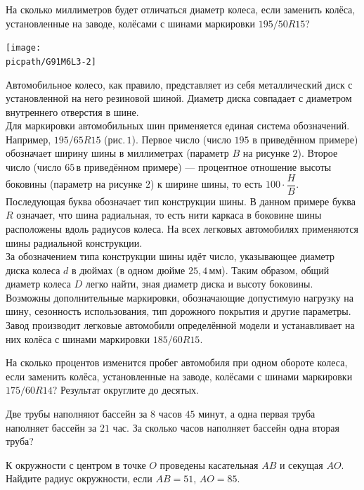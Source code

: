 \begin{homework}[number=3]
	\begin{listofex}
		\item На сколько миллиметров будет отличаться диаметр колеса, если заменить колёса, установленные на заводе, колёсами с шинами маркировки \( 195/50 R15 \)?
		\begin{center}
			\texttt{[image: \\picpath/G91M6L3-2]}
		\end{center}
		Автомобильное колесо, как правило, представляет из себя металлический диск с установленной на него резиновой шиной. Диаметр диска совпадает с диаметром внутреннего отверстия в шине.\\
		Для маркировки автомобильных шин применяется единая система обозначений. Например, \( 195/65 R15 \) (рис. \( 1 \)). Первое число (число \( 195 \) в приведённом примере) обозначает ширину шины в миллиметрах (параметр \( B \) на рисунке \( 2 \)). Второе число (число \( 65 \) в приведённом примере)  — процентное отношение высоты боковины (параметр на рисунке \( 2 \)) к ширине шины, то есть \( 100\cdot\dfrac{H}{B} \). \\
		Последующая буква обозначает тип конструкции шины. В данном примере буква \( R \) означает, что шина радиальная, то есть нити каркаса в боковине шины расположены вдоль радиусов колеса. На всех легковых автомобилях применяются шины радиальной конструкции.\\		
		За обозначением типа конструкции шины идёт число, указывающее диаметр диска колеса \( d \) в дюймах (в одном дюйме \( 25,4 \) мм). Таким образом, общий диаметр колеса \( D \) легко найти, зная диаметр диска и высоту боковины.\\		
		Возможны дополнительные маркировки, обозначающие допустимую нагрузку на шину, сезонность использования, тип дорожного покрытия и другие параметры.		
		Завод производит легковые автомобили определённой модели и устанавливает на них колёса с шинами маркировки \( 185/60 R15 \).
		\item На сколько процентов изменится пробег автомобиля при одном обороте колеса, если заменить колёса, установленные на заводе, колёсами с шинами маркировки \( 175/60 R14 \)? Результат округлите до десятых.
		\item Две трубы наполняют бассейн за \( 8 \) часов \( 45 \) минут, а одна первая труба наполняет бассейн за \( 21 \) час. За сколько часов наполняет бассейн одна вторая труба?
		\item К окружности с центром в точке \( O \) проведены касательная \( AB \) и секущая \( AO \). Найдите радиус окружности, если \( AB=51 \), \( AO=85 \).

\end{listofex}
\end{homework}
